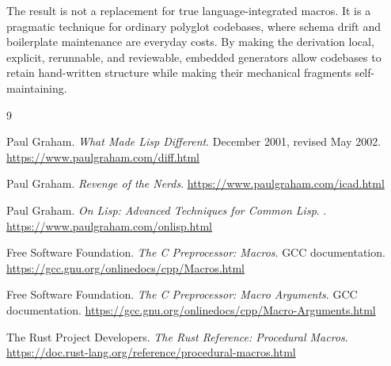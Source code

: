 \documentclass[11pt]{article}
\begin{document}
The result is not a replacement for true language-integrated macros.  It is a
pragmatic technique for ordinary polyglot codebases, where schema drift and
boilerplate maintenance are everyday costs.  By making the derivation local,
explicit, rerunnable, and reviewable, embedded generators allow codebases to
retain hand-written structure while making their mechanical fragments
self-maintaining.

\begin{thebibliography}{9}

Paul Graham.
\newblock \emph{What Made Lisp Different}.
\newblock December 2001, revised May 2002.
\newblock \url{https://www.paulgraham.com/diff.html}

Paul Graham.
\newblock \emph{Revenge of the Nerds}.
\newblock \url{https://www.paulgraham.com/icad.html}

Paul Graham.
\newblock \emph{On Lisp: Advanced Techniques for Common Lisp}.
.
\newblock \url{https://www.paulgraham.com/onlisp.html}

Free Software Foundation.
\newblock \emph{The C Preprocessor: Macros}.
\newblock GCC documentation.
\newblock \url{https://gcc.gnu.org/onlinedocs/cpp/Macros.html}

Free Software Foundation.
\newblock \emph{The C Preprocessor: Macro Arguments}.
\newblock GCC documentation.
\newblock \url{https://gcc.gnu.org/onlinedocs/cpp/Macro-Arguments.html}

The Rust Project Developers.
\newblock \emph{The Rust Reference: Procedural Macros}.
\newblock \url{https://doc.rust-lang.org/reference/procedural-macros.html}

\end{thebibliography}
\end{document}
